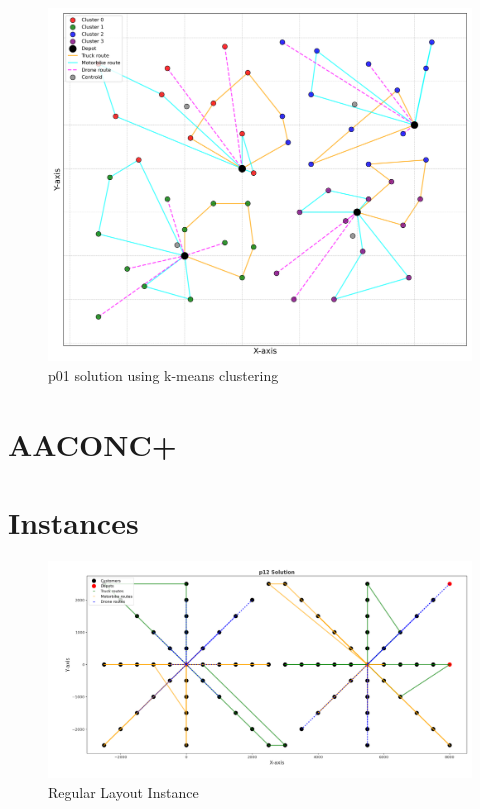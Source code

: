 \documentclass{article}
\begin{document}
	\begin{figure}[h]
		\caption[width=\textwidth]{p01 solution using k-means clustering}
		\includegraphics[width=\textwidth]{solution-p01}
		\centering
	\end{figure}
	\clearpage
	\section{AACONC+}
	\;
	\;
	\;
	\;
	\clearpage
	\onecolumn
	\section{Instances}
	\;
	\clearpage
	\begin{figure}[h!]
		\centering
		\caption{Regular Layout Instance}
		\includegraphics[width=\columnwidth]{p12_aco-1}
	\end{figure}
\end{document}
